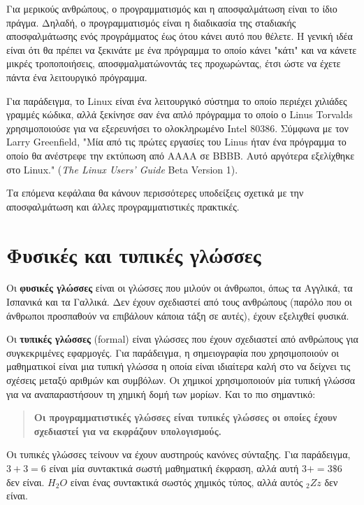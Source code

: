 \documentclass[10pt]{book}
\begin{document}
 Για μερικούς ανθρώπους, ο προγραμματισμός και η αποσφαλμάτωση είναι το ίδιο
πράγμα.  Δηλαδή, ο προγραμματισμός είναι η διαδικασία της σταδιακής
αποσφαλμάτωσης ενός προγράμματος έως ότου κάνει αυτό που θέλετε.   
Η γενική ιδέα είναι ότι θα πρέπει να ξεκινάτε με ένα πρόγραμμα το
οποίο κάνει "κάτι" και να κάνετε μικρές τροποποιήσεις, αποσφμαλματώνοντάς τες
προχωρώντας, έτσι ώστε να έχετε πάντα ένα λειτουργικό πρόγραμμα.  

Για παράδειγμα, το  Linux  είναι ένα λειτουργικό σύστημα το οποίο
περιέχει χιλιάδες γραμμές κώδικα, αλλά ξεκίνησε σαν ένα απλό πρόγραμμα
το οποίο ο  Linus Torvalds  χρησιμοποιούσε για να εξερευνήσει
το ολοκληρωμένο  Intel 80386.   Σύμφωνα με τον  Larry Greenfield,
 "Μία από τις πρώτες εργασίες του  Linus  ήταν ένα πρόγραμμα
το οποίο θα ανέστρεφε την εκτύπωση από ΑΑΑΑ σε ΒΒΒΒ.  Αυτό αργότερα εξελίχθηκε
στο  Linux."  ({\em The Linux Users' Guide} Beta Version 1).

 Τα επόμενα κεφάλαια θα κάνουν περισσότερες υποδείξεις σχετικά με την αποσφαλμάτωση και
άλλες προγραμματιστικές πρακτικές.


\section{Φυσικές και τυπικές γλώσσες}

Οι {\bf φυσικές γλώσσες} είναι οι γλώσσες που μιλούν οι άνθρωποι,
όπως τα Αγγλικά, τα Ισπανικά και τα Γαλλικά.  Δεν έχουν σχεδιαστεί
από τους ανθρώπους (παρόλο που οι άνθρωποι προσπαθούν να επιβάλουν
κάποια τάξη σε αυτές), έχουν εξελιχθεί φυσικά.

Οι {\bf τυπικές γλώσσες} (formal) είναι γλώσσες που έχουν σχεδιαστεί από ανθρώπους
για συγκεκριμένες εφαρμογές.  Για παράδειγμα, η σημειογραφία που χρησιμοποιούν
οι μαθηματικοί είναι μια τυπική γλώσσα η οποία είναι ιδιαίτερα καλή στο
να δείχνει τις σχέσεις μεταξύ αριθμών και συμβόλων.  Οι χημικοί χρησιμοποιούν
μία τυπική γλώσσα για να αναπαραστήσουν τη χημική δομή των μορίων. Και το πιο
σημαντικό:

\begin{quote}
{\bf Οι προγραμματιστικές γλώσσες είναι τυπικές γλώσσες οι οποίες έχουν σχεδιαστεί
για να εκφράζουν υπολογισμούς.}
\end{quote}

Οι τυπικές γλώσσες τείνουν να έχουν αυστηρούς κανόνες σύνταξης.  Για
παράδειγμα,
$3 + 3 = 6$  είναι μία συντακτικά σωστή μαθηματική έκφραση, αλλά αυτή
$3 + = 3 \mbox{\$} 6$ δεν είναι.
$H_2O$ είναι ένας συντακτικά σωστός
χημικός τύπος, αλλά αυτός $_2Zz$ δεν είναι.
\end{document}
